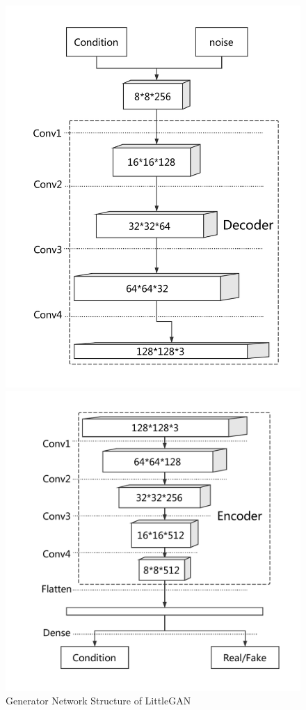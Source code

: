 \begin{figure}
    \begin{minipage}[t]{0.48\linewidth}
        \centering
        \includegraphics[width=\textwidth]{figures/net_generator.pdf}
        \caption{Generator Network Structure of LittleGAN}
        \label{net_generator}
    \end{minipage}
        \hfill
    \begin{minipage}[t]{0.48\linewidth}
        \centering
        \includegraphics[width=\textwidth]{figures/net_discriminator.pdf}

\end{minipage}
\end{figure}
